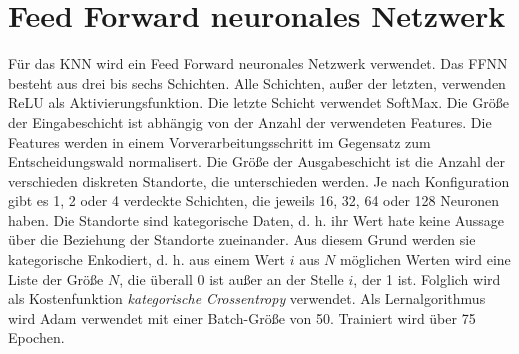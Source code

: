 \section{Feed Forward neuronales Netzwerk}
Für das KNN wird ein Feed Forward neuronales Netzwerk verwendet.
Das FFNN besteht aus drei bis sechs Schichten.
Alle Schichten, außer der letzten, verwenden ReLU als Aktivierungsfunktion.
Die letzte Schicht verwendet SoftMax.
\newline
\newline
Die Größe der Eingabeschicht ist abhängig von der Anzahl der verwendeten Features.
Die Features werden in einem Vorverarbeitungsschritt im Gegensatz zum Entscheidungswald normalisert.
Die Größe der Ausgabeschicht ist die Anzahl der verschieden diskreten Standorte, die unterschieden werden.
Je nach Konfiguration gibt es 1, 2 oder 4 verdeckte Schichten, die jeweils 16, 32, 64 oder 128 Neuronen haben.
\newline
\newline
Die Standorte sind kategorische Daten, d. h. ihr Wert hate keine Aussage über die Beziehung der Standorte zueinander.
Aus diesem Grund werden sie kategorische Enkodiert, d. h. aus einem Wert $i$ aus $N$ möglichen Werten wird eine Liste der Größe $N$,
die überall 0 ist außer an der Stelle $i$, der 1 ist.
Folglich wird als Kostenfunktion \textit{kategorische Crossentropy} verwendet.
\newline
\newline
Als Lernalgorithmus wird Adam verwendet mit einer Batch-Größe von 50.
Trainiert wird über 75 Epochen.

\iffalse
\begin{itemize}
    \item Braucht man mehr Neuronen/Hidden Layer mit steigender Ort Anzahl?
\end{itemize}
\fi